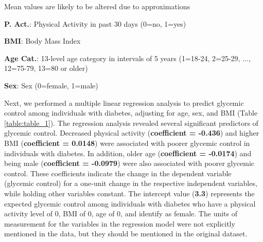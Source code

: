 \documentclass[11pt]{article}
\begin{document}
\begin{table}[h]
\caption{Mean and Std Dev of P. Act., BMI, Age Cat., and Sex stratified by Diab. Status}
\label{table:table_0}
\begin{threeparttable}
\renewcommand{\TPTminimum}{\linewidth}
\begin{tablenotes}
\footnotesize
\item Mean values are likely to be altered due to approximations
\item \textbf{P. Act.}: Physical Activity in past 30 days (0=no, 1=yes)
\item \textbf{BMI}: Body Mass Index
\item \textbf{Age Cat.}: 13-level age category in intervals of 5 years (1=18-24, 2=25-29, ..., 12=75-79, 13=80 or older)
\item \textbf{Sex}: Sex (0=female, 1=male)
\end{tablenotes}
\end{threeparttable}
\end{table}


Next, we performed a multiple linear regression analysis to predict glycemic control among individuals with diabetes, adjusting for age, sex, and BMI (Table \ref{table:table_1}). The regression analysis revealed several significant predictors of glycemic control. Decreased physical activity (\textbf{coefficient = -0.436}) and higher BMI (\textbf{coefficient = 0.0148}) were associated with poorer glycemic control in individuals with diabetes. In addition, older age (\textbf{coefficient = -0.0174}) and being male (\textbf{coefficient = -0.0979}) were also associated with poorer glycemic control. These coefficients indicate the change in the dependent variable (glycemic control) for a one-unit change in the respective independent variables, while holding other variables constant. The intercept value (\textbf{3.3}) represents the expected glycemic control among individuals with diabetes who have a physical activity level of 0, BMI of 0, age of 0, and identify as female. The units of measurement for the variables in the regression model were not explicitly mentioned in the data, but they should be mentioned in the original dataset.
\end{document}
